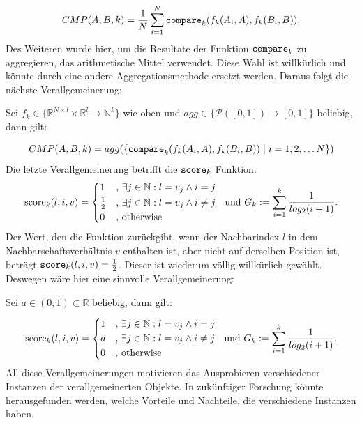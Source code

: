 \documentclass[12pt,letterpaper,ngerman]{article}
\begin{document}
\[
  CMP(A,B,k) = 
  \frac{1}{N}\sum_{i = 1}^{N} 
  \verb|compare|_k(f_k(A_i,A),f_k(B_i, B)).
\]
Des Weiteren wurde hier, um die Resultate der Funktion 
$\verb|compare|_k$ zu aggregieren, das arithmetische Mittel
verwendet. Diese Wahl ist willkürlich und könnte durch eine 
andere Aggregationsmethode ersetzt werden. Daraus
folgt die nächste Verallgemeinerung:
\begin{center}
  Sei $f_k \in \{\mathbb{R}^{N\times l}
  \times \mathbb{R}^l \to \mathbb{N}^k\}$ wie oben und 
  $agg \in \{\mathcal{P}([0,1]) \to [0,1]\}$ beliebig, 
  dann gilt:
\end{center}
\[ 
  CMP(A,B,k) = 
  agg(\{\verb|compare|_k(f_k(A_i,A),f_k(B_i,B)) 
    \hspace{0.1cm}|\hspace{0.1cm} i = 1,2, \dots N\})
\]
Die letzte Verallgemeinerung betrifft die $\verb|score|_k$
Funktion. 
\[
  \text{score}_k(l,i,v) = \begin{cases*} 
      1 & , $\exists j \in \mathbb{N}: l = v_j \land i = j$   \\
      \frac{1}{2} & , $\exists j \in \mathbb{N}: l = v_j \land i \neq j$\\
      0   & , \text{otherwise}
    \end{cases*}  \text{  und  }
    G_k := \sum_{i=1}^{k} \frac{1}{log_2(i+1)}.
\]
Der Wert, den die Funktion zurückgibt, wenn der Nachbarindex 
$l$ in dem Nachbarschaftsverhältnis $v$ enthalten ist,
aber nicht auf derselben Position ist,
beträgt $\verb|score|_k(l,i,v) = \frac{1}{2}$. 
Dieser ist wiederum völlig willkürlich gewählt.
Deswegen wäre hier eine sinnvolle Verallgemeinerung:
\begin{center}
  Sei $a \in (0,1) \subset \mathbb{R}$ beliebig, dann gilt:
\end{center}
\[
  \text{score}_k(l,i,v) = \begin{cases*} 
      1 & , $\exists j \in \mathbb{N}: l = v_j \land i = j$   \\
      a & , $\exists j \in \mathbb{N}: l = v_j \land i \neq j$\\
      0 & , \text{otherwise}
    \end{cases*}  \text{  und  }
    G_k := \sum_{i=1}^{k} \frac{1}{log_2(i+1)}.
\]
All diese Verallgemeinerungen motivieren das
Ausprobieren verschiedener Instanzen der verallgemeinerten 
Objekte. In zukünftiger Forschung könnte herausgefunden  
werden, welche Vorteile und Nachteile, die verschiedene 
Instanzen haben.\\\\
\end{document}
